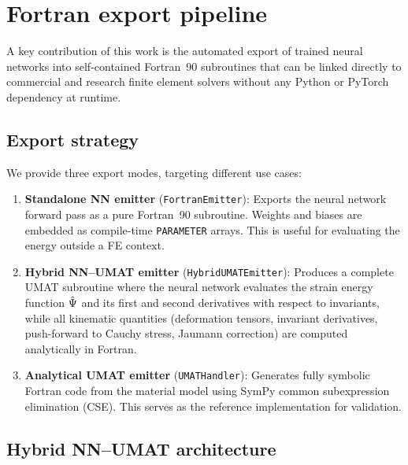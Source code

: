 \section{Fortran export pipeline}
\label{sec:fortran_export}

A key contribution of this work is the automated export of trained neural
networks into self-contained Fortran~90 subroutines that can be linked
directly to commercial and research finite element solvers without any
Python or PyTorch dependency at runtime.

\subsection{Export strategy}
\label{sec:fortran_export:strategy}

We provide three export modes, targeting different use cases:

\begin{enumerate}
  \item \textbf{Standalone NN emitter} (\texttt{FortranEmitter}): Exports the
    neural network forward pass as a pure Fortran~90 subroutine.  Weights and
    biases are embedded as compile-time \texttt{PARAMETER} arrays.  This is
    useful for evaluating the energy outside a FE context.

  \item \textbf{Hybrid NN--UMAT emitter} (\texttt{HybridUMATEmitter}):
    Produces a complete UMAT subroutine where the neural network evaluates
    the strain energy function $\hat{\Psi}$ and its first and second
    derivatives with respect to invariants, while all kinematic quantities
    (deformation tensors, invariant derivatives, push-forward to Cauchy
    stress, Jaumann correction) are computed analytically in Fortran.

  \item \textbf{Analytical UMAT emitter} (\texttt{UMATHandler}): Generates
    fully symbolic Fortran code from the material model using SymPy common
    subexpression elimination (CSE).  This serves as the reference
    implementation for validation.
\end{enumerate}

\subsection{Hybrid NN--UMAT architecture}
\label{sec:fortran_export:hybrid}

